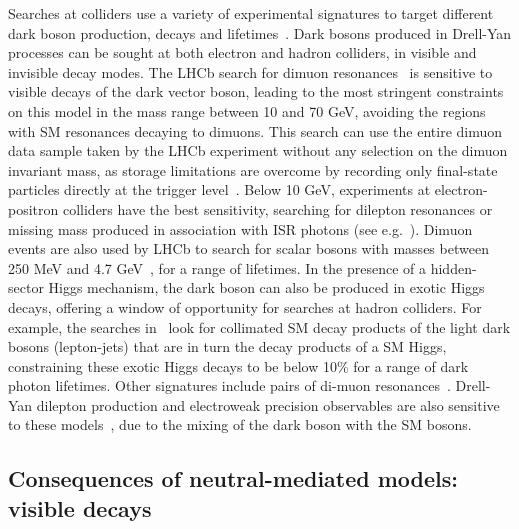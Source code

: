 Searches at colliders use a variety of experimental signatures to target different dark boson production, decays and lifetimes~\cite{Curtin:2014cca}. 
Dark bosons produced in Drell-Yan processes can be sought at both electron and hadron colliders, in visible and invisible decay modes. 
The LHCb search for dimuon resonances~\cite{Aaij:2017rft} is sensitive to visible decays of the dark vector boson, leading to the most stringent constraints on this model in the mass range between 10 and 70 GeV, avoiding the regions with SM resonances decaying to dimuons. 
This search can use the entire dimuon data sample taken by the LHCb experiment without any selection on the dimuon invariant mass, as storage limitations are overcome by recording only final-state particles directly at the trigger level~\cite{Aaij:2016rxn}. 
Below 10 GeV, experiments at electron-positron colliders have the best sensitivity, searching for dilepton resonances or missing mass produced in association with ISR photons (see e.g.~\cite{Lees:2014xha,Lees:2017lec}). %
Dimuon events are also used by LHCb to search for scalar bosons with masses between 250 MeV and 4.7 GeV~\cite{Aaij:2016qsm}, for a range of lifetimes. 
In the presence of a hidden-sector Higgs mechanism, the dark boson can also be produced in exotic Higgs decays, offering a window of opportunity %
for searches at hadron colliders. 
For example, the searches in~\cite{ATLAS:2016jza,CMS-PAS-HIG-16-035} look for collimated SM decay products of the light dark bosons (lepton-jets) that are in turn the decay products of a SM Higgs, constraining these exotic Higgs decays to be below 10\% for a range of dark photon lifetimes. 
Other signatures include pairs of di-muon resonances~\cite{Aad:2015sva,CMS-PAS-HIG-16-035}.
Drell-Yan dilepton production and electroweak precision observables are also sensitive to these models~\cite{Curtin:2014cca}, due to the mixing of the dark boson with the SM bosons. 

\subsection{Consequences of neutral-mediated models: visible decays}
\label{sec:MediatorSearches}
\label{sub:twoBody}


